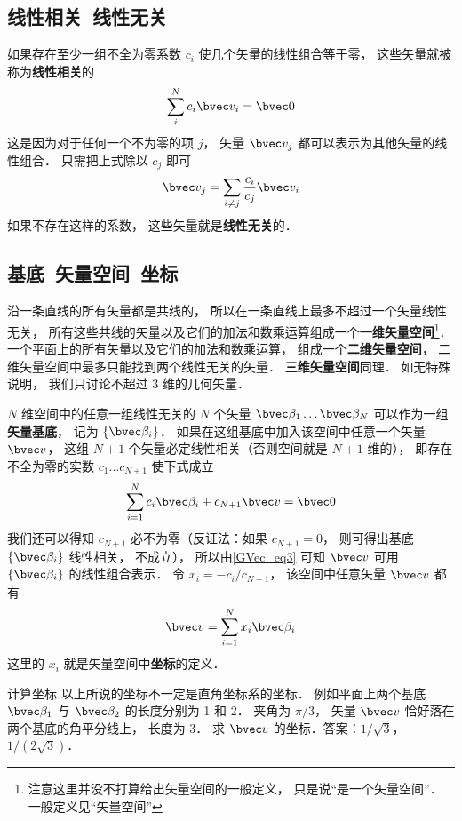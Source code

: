 \subsection{线性相关\ 线性无关}
如果存在至少一组不全为零系数 $c_i$ 使几个矢量的线性组合等于零， 这些矢量就被称为\textbf{线性相关}的
\begin{equation}\label{GVec_eq2}
\sum_i^N c_i \bvec v_i = \bvec 0
\end{equation}
这是因为对于任何一个不为零的项 $j$， 矢量 $\bvec v_j$ 都可以表示为其他矢量的线性组合． 只需把上式除以 $c_j$ 即可
\begin{equation}\label{GVec_eq3}
\bvec v_j = \sum_{i \ne j}\frac{c_i}{c_j} \bvec v_i
\end{equation}
如果不存在这样的系数， 这些矢量就是\textbf{线性无关}的． 

\subsection{基底\ 矢量空间\ 坐标}
沿一条直线的所有矢量都是共线的， 所以在一条直线上最多不超过一个矢量线性无关， 所有这些共线的矢量以及它们的加法和数乘运算组成一个\textbf{一维矢量空间}\footnote{注意这里并没不打算给出矢量空间的一般定义， 只是说“是一个矢量空间”． 一般定义见“矢量空间”}． 一个平面上的所有矢量以及它们的加法和数乘运算， 组成一个\textbf{二维矢量空间}， 二维矢量空间中最多只能找到两个线性无关的矢量． \textbf{三维矢量空间}同理． 如无特殊说明， 我们只讨论不超过 3 维的几何矢量．

$N$ 维空间中的任意一组线性无关的 $N$ 个矢量 $\bvec \beta_1\dots \bvec \beta_N$ 可以作为一组\textbf{矢量基底}， 记为 $\{\bvec \beta_i\}$． 如果在这组基底中加入该空间中任意一个矢量 $\bvec v$， 这组 $N+1$ 个矢量必定线性相关（否则空间就是 $N+1$ 维的）， 即存在不全为零的实数 $c_1\dots c_{N+1}$ 使下式成立
\begin{equation}
\sum_{i=1}^N c_i \bvec \beta_i + c_{N+1} \bvec v = \bvec 0
\end{equation}
我们还可以得知 $c_{N+1}$ 必不为零（反证法：如果 $c_{N+1} = 0$， 则可得出基底 $\{\bvec \beta_i\}$ 线性相关， 不成立）， 所以由\autoref{GVec_eq3} 可知 $\bvec v$ 可用 $\{\bvec \beta_i\}$ 的线性组合表示． 令 $x_i = -c_i/c_{N+1}$， 该空间中任意矢量 $\bvec v$ 都有
\begin{equation}\label{GVec_eq5}
\bvec v = \sum_{i=1}^N x_i \bvec \beta_i
\end{equation}
这里的 $x_i$ 就是矢量空间中\textbf{坐标}的定义．

\begin{exercise}{计算坐标}
以上所说的坐标不一定是直角坐标系的坐标． 例如平面上两个基底 $\bvec \beta_1$ 与 $\bvec \beta_2$ 的长度分别为 1 和 2． 夹角为 $\pi/3$， 矢量 $\bvec v$ 恰好落在两个基底的角平分线上， 长度为 3． 求 $\bvec v$ 的坐标．答案：$1/\sqrt 3$， $1/(2\sqrt 3)$．
\end{exercise}

